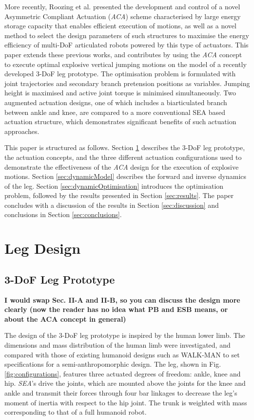 \documentclass[letterpaper, 10 pt, conference]{ieeeconf}  %
\begin{document}
More recently, Roozing et al. \cite{roozing2016development, roozing2016design} presented the development and control of a novel Asymmetric Compliant Actuation (\textit{ACA}) scheme characterised by large energy storage capacity that enables efficient execution of motions, as well as a novel method to select the design parameters of such structures to maximise the energy efficiency of multi-DoF articulated robots powered by this type of actuators. This paper extends these previous works, and contributes by using the \textit{ACA} concept to execute optimal explosive vertical jumping motions on the model of a recently developed 3-DoF leg prototype. The optimisation problem is formulated with joint trajectories and secondary branch pretension positions as variables. Jumping height is maximised and active joint torque is minimised simultaneously. Two augmented actuation designs, one of which includes a biarticulated branch between ankle and knee, are compared to a more conventional SEA based actuation structure, which demonstrates significant benefits of such actuation approaches.

This paper is structured as follows. Section \ref{sec:legDesign} describes the 3-DoF leg prototype, the actuation concepts, and the three different actuation configurations used to demonstrate the effectiveness of the \textit{ACA} design for the execution of explosive motions. Section \ref{sec:dynamicModel} describes the forward and inverse dynamics of the leg. Section \ref{sec:dynamicOptimisation} introduces the optimisation problem, followed by the results presented in Section \ref{sec:results}. The paper concludes with a discussion of the results in Section \ref{sec:discussion} and conclusions in Section \ref{sec:conclusions}.


\section{Leg Design}
\label{sec:legDesign}

\subsection{3-DoF Leg Prototype}
\textbf{I would swap Sec. II-A and II-B, so you can discuss the design more clearly (now the reader has no idea what PB and ESB means, or about the ACA concept in general)}

The design of the 3-DoF leg prototype is inspired by the human lower limb. The dimensions and mass distribution of the human limb were investigated, and compared with those of existing humanoid designs such as WALK-MAN \cite{tsagarakis2017walk} to set specifications for a semi-anthropomorphic design. The leg, shown in Fig. \ref{fig:configurations}, features three actuated degrees of freedom: ankle, knee and hip. \textit{SEA}'s drive the joints, which are mounted above the joints for the knee and ankle and transmit their forces through four bar linkages to decrease the leg’s moment of inertia with respect to the hip joint. The trunk is weighted with mass corresponding to that of a full humanoid robot.
\end{document}
